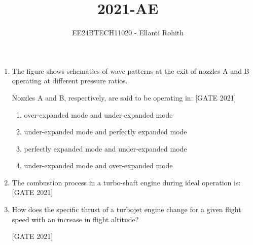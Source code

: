 \documentclass[journal,12pt,onecolumn]{IEEEtran}
\theoremstyle{remark}
\begin{document}

\vspace{3cm}

\title{2021-AE}
\author{EE24BTECH11020 -  Ellanti Rohith}
\maketitle

\renewcommand{\thefigure}{\theenumi}
\renewcommand{\thetable}{\theenumi}
\begin{enumerate}
  \item The figure shows schematics of wave patterns at the exit of nozzles A and B operating at different pressure ratios.




Nozzles A and B, respectively, are said to be operating in: 
 \hfill{[GATE 2021]}\begin{enumerate}
    
        \item over-expanded mode and under-expanded mode
        \item under-expanded mode and perfectly expanded mode
        \item perfectly expanded mode and under-expanded mode
        \item under-expanded mode and over-expanded mode\\
   
\end{enumerate}
\item The combustion process in a turbo-shaft engine during ideal operation is: \hfill{[GATE 2021]}\begin{enumerate} 
    
\end{enumerate} 
\item How does the specific thrust of a turbojet engine change for a given flight speed with an increase in flight altitude?

\hfill{[GATE 2021]}\begin{enumerate}
\end{enumerate}


\end{enumerate}
\end{document}
